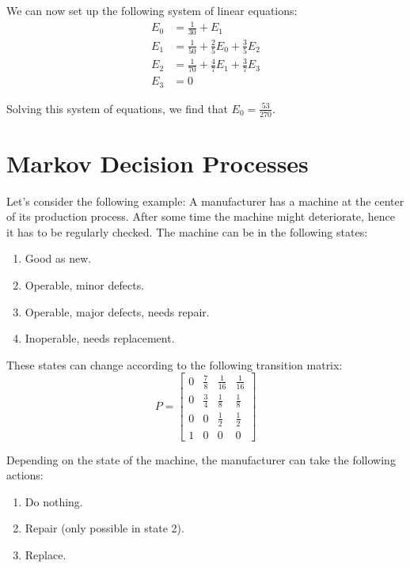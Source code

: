\documentclass[12pt]{article}
\begin{document}
\noindent
We can now set up the following system of linear equations:
\begin{equation*}
    \begin{split}
        E_0 & = \frac{1}{30} + E_1 \\
        E_1 & = \frac{1}{50} + \frac{2}{5}E_0 + \frac{3}{5}E_2 \\
        E_2 & = \frac{1}{70} + \frac{4}{7}E_1 + \frac{3}{7}E_3 \\
        E_3 & = 0
    \end{split}
\end{equation*}

\noindent
Solving this system of equations, we find that $E_0 = \frac{53}{270}$.

%
%
\newpage
\section{Markov Decision Processes}
Let's consider the following example:
A manufacturer has a machine at the center of its production process.
After some time the machine might deteriorate, hence it has to be regularly checked.
The machine can be in the following states:

\begin{enumerate}\addtocounter{enumi}{-1}
    \item Good as new.
    \item Operable, minor defects.
    \item Operable, major defects, needs repair.
    \item Inoperable, needs replacement.
\end{enumerate}

\noindent
These states can change according to the following transition matrix:
\[ P = \begin{bmatrix}
    0 & \frac{7}{8} & \frac{1}{16} & \frac{1}{16} \\
    0 & \frac{3}{4} & \frac{1}{8} & \frac{1}{8} \\
    0 & 0 & \frac{1}{2} & \frac{1}{2} \\
    1 & 0 & 0 & 0
\end{bmatrix} \]

\noindent
Depending on the state of the machine, the manufacturer can take the following actions:

\begin{enumerate}
    \item Do nothing.
    \item Repair (only possible in state 2).
    \item Replace.
\end{enumerate}
\end{document}
